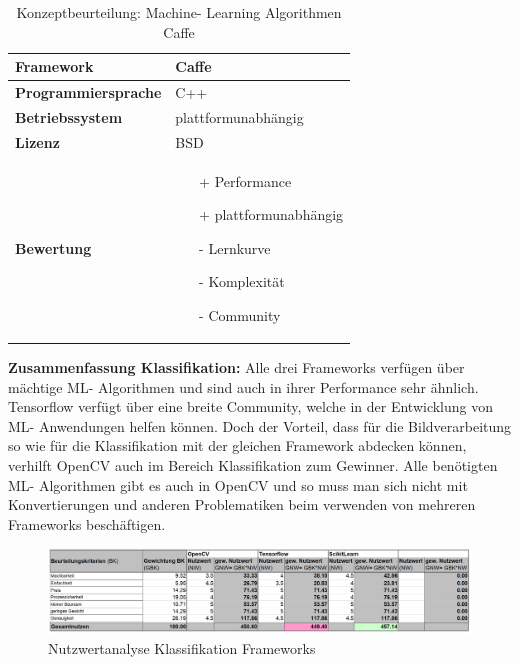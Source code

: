 \documentclass[../../../main.tex]{subfiles}
\begin{document}
        \begin{flushleft}
            \begin{table}[h]
            \begin{tabular}{ | l | p{11cm} |}
            \hline
            \textbf{Framework} & Caffe \\ \hline
            \textbf{Programmiersprache} & C++ \\ \hline
            \textbf{Betriebssystem} & plattformunabhängig \\ \hline
            \textbf{Lizenz} & BSD \\ \hline
            \textbf{Bewertung} &  \begin{itemize}
                                    \item[+] Performance
                                    \item[+] plattformunabhängig 
                                    \item[-] Lernkurve
                                    \item[-] Komplexität 
                                    \item[-] Community 
                                  \end{itemize} \\ \hline
            \end{tabular}
            \caption{Konzeptbeurteilung: Machine- Learning Algorithmen Caffe}
            \label{tab:konzept_ML_Caffe}
            \end{table}
        \end{flushleft}

        \vspace{1cm}

        \textbf{Zusammenfassung Klassifikation: }
        Alle drei Frameworks verfügen über mächtige ML- Algorithmen und sind auch in ihrer Performance sehr ähnlich. Tensorflow verfügt über eine breite Community, welche in der Entwicklung von ML- Anwendungen helfen können. Doch der Vorteil, dass für die Bildverarbeitung so wie für die Klassifikation mit der gleichen Framework abdecken können, verhilft OpenCV auch im Bereich Klassifikation zum Gewinner. Alle benötigten ML- Algorithmen gibt es auch in OpenCV und so muss man sich nicht mit Konvertierungen und anderen Problematiken beim verwenden von mehreren Frameworks beschäftigen.


        \begin{figure}[H] 
            \centering
            \includegraphics[width=1\textwidth]{Nutzwert_machineLearning.png}
            \caption{Nutzwertanalyse Klassifikation Frameworks}
            \label{fig:ML_nutzwert}
        \end{figure}



        
    
    
    
    
    
\end{document}
